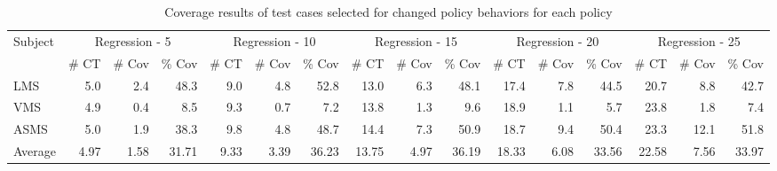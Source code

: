 


%
%
%


\begin{table}[htbp]
  \centering
  \caption{Coverage results of test cases selected for changed policy behaviors for each policy}
  	\vspace{-8pt}   
    \begin{tabular}{|l|r|r|r||r|r|r||r|r|r||r|r|r||r|r|r|}
\hline
     \multirow{2}{*}{Subject} & \multicolumn{3}{|c||}{Regression - 5} & \multicolumn{3}{|c||}{Regression - 10} & \multicolumn{3}{|c||}{Regression - 15} & \multicolumn{3}{|c||}{Regression - 20} & \multicolumn{3}{|c|}{Regression - 25} \\\cline{2-16}
       & \# CT & \# Cov & \% Cov & \# CT & \# Cov & \% Cov & \# CT & \# Cov & \% Cov & \# CT & \# Cov & \% Cov & \# CT & \# Cov & \% Cov \\\hline\hline
    LMS   & 5.0   & 2.4   & 48.3  & 9.0   & 4.8   & 52.8  & 13.0  & 6.3   & 48.1  & 17.4  & 7.8   & 44.5  & 20.7  & 8.8   & 42.7 \\\hline
    VMS   & 4.9   & 0.4   & 8.5   & 9.3   & 0.7   & 7.2   & 13.8  & 1.3   & 9.6   & 18.9  & 1.1   & 5.7   & 23.8  & 1.8   & 7.4 \\\hline
    ASMS  & 5.0   & 1.9   & 38.3  & 9.8   & 4.8   & 48.7  & 14.4  & 7.3   & 50.9  & 18.7  & 9.4   & 50.4  & 23.3  & 12.1  & 51.8 \\\hline\hline
    Average & 4.97  & 1.58  & 31.71 & 9.33  & 3.39  & 36.23 & 13.75 & 4.97  & 36.19 & 18.33 & 6.08  & 33.56 & 22.58 & 7.56  & 33.97 \\\hline

    \end{tabular}%
  \label{tab:cov-results}%
\end{table}%

